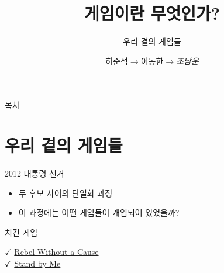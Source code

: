 \documentclass[final]{beamer}
\title{게임이란 무엇인가?}
\subtitle{우리 곁의 게임들}
\author[조남운]{허준석$\rightarrow$이동한$\rightarrow$\emph{조남운}\\\mail}
\begin{document}
\begin{frame}[t]{}
	\titlepage
\end{frame}

\begin{frame}[t]{목차}
	\tableofcontents
\end{frame}

\section{우리 곁의 게임들} %
\label{sec:GamesInPractice}

\begin{frame}[t]{2012 대통령 선거}
	\begin{itemize}
		\item 두 후보 사이의 단일화 과정  
		\item 이 과정에는 어떤 게임들이 개입되어 있었을까?
	\end{itemize}
\end{frame}

\begin{frame}[t]{치킨 게임}
	\begin{center}
	\end{center}
	$\checkmark$ \href{http://www.youtube.com/watch?v=u7hZ9jKrwvo}{Rebel Without a Cause} \\
	$\checkmark$ \href{http://www.youtube.com/watch?v=6L-IbkWHsOE}{Stand by Me}
\end{frame}
\end{document}
